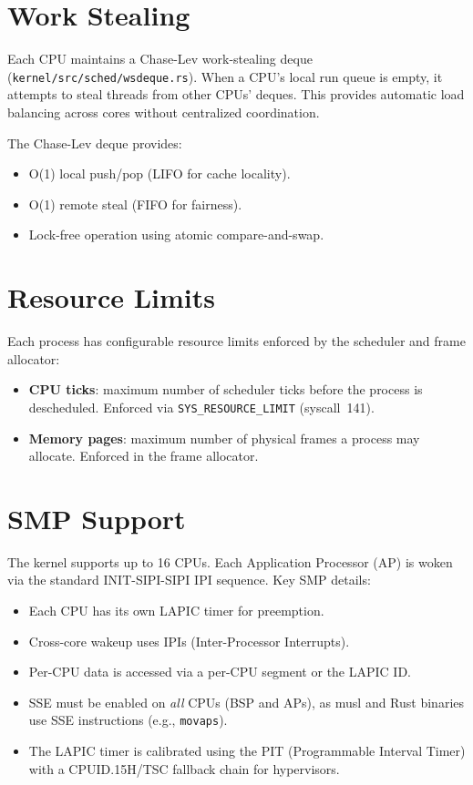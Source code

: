 \documentclass[11pt,a4paper,twoside]{report}
\theoremstyle{definition}
\newcommand{\syscall}[1]{\texttt{#1}}
\newcommand{\file}[1]{\texttt{#1}}
\begin{document}
\section{Work Stealing}

Each CPU maintains a Chase-Lev work-stealing deque
(\file{kernel/src/sched/wsdeque.rs}). When a CPU's local run queue is empty,
it attempts to steal threads from other CPUs' deques. This provides
automatic load balancing across cores without centralized coordination.

The Chase-Lev deque provides:
\begin{itemize}[leftmargin=1.4em]
  \item O(1) local push/pop (LIFO for cache locality).
  \item O(1) remote steal (FIFO for fairness).
  \item Lock-free operation using atomic compare-and-swap.
\end{itemize}

\section{Resource Limits}

Each process has configurable resource limits enforced by the scheduler
and frame allocator:
\begin{itemize}[leftmargin=1.4em]
  \item \textbf{CPU ticks}: maximum number of scheduler ticks before
    the process is descheduled. Enforced via \syscall{SYS\_RESOURCE\_LIMIT}
    (syscall~141).
  \item \textbf{Memory pages}: maximum number of physical frames a process
    may allocate. Enforced in the frame allocator.
\end{itemize}

\section{SMP Support}

The kernel supports up to 16 CPUs. Each Application Processor (AP) is woken
via the standard INIT-SIPI-SIPI IPI sequence. Key SMP details:

\begin{itemize}[leftmargin=1.4em]
  \item Each CPU has its own LAPIC timer for preemption.
  \item Cross-core wakeup uses IPIs (Inter-Processor Interrupts).
  \item Per-CPU data is accessed via a per-CPU segment or the LAPIC ID.
  \item SSE must be enabled on \emph{all} CPUs (BSP and APs), as musl and
    Rust binaries use SSE instructions (e.g., \texttt{movaps}).
  \item The LAPIC timer is calibrated using the PIT (Programmable Interval
    Timer) with a CPUID.15H/TSC fallback chain for hypervisors.
\end{itemize}
\end{document}
